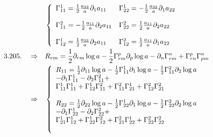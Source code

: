 \begin{align}
& \left \{ \begin{array}{ll}
\Gamma^1_{11} = \frac{1}{2}\frac{a_{22}}{a}\partial_1 a_{11}&\Gamma^1_{22} =- \frac{1}{2}\frac{a_{22}}{a}\partial_1 a_{22}\\\\
\Gamma^2_{11} =- \frac{1}{2}\frac{a_{11}}{a}\partial_2 a_{11}&\Gamma^2_{22} = \frac{1}{2}\frac{a_{11}}{a}\partial_2 a_{22}\\\\
\Gamma^1_{12} = \frac{1}{2}\frac{a_{22}}{a}\partial_2 a_{11}&\Gamma^2_{12} = \frac{1}{2}\frac{a_{11}}{a}\partial_1 a_{22}
\end {array}\right. \\
\text{3.205.}\quad\Rightarrow\quad & R_{rm} = \frac{1}{2}\partial_{rm} \log a - \frac{1}{2} \Gamma^p_{rm}\partial_p \log a-\partial_n\Gamma^n_{rm} + \Gamma^p_{rn}\Gamma^n_{pm}\\
\Rightarrow\quad &\left \{ \begin{array}{l}
 R_{11} =  \frac{1}{2}\partial_{11} \log a - \frac{1}{2} \Gamma^1_{11}\partial_1 \log a- \frac{1}{2} \Gamma^2_{11}\partial_2 \log a \\
 -\partial_1\Gamma^1_{11}-\partial_2\Gamma^2_{11} + 
 \\ \Gamma^1_{11}\Gamma^1_{11}+ \Gamma^1_{12}\Gamma^2_{11}+ \Gamma^2_{11}\Gamma^1_{21}+ \Gamma^2_{12}\Gamma^2_{21}\\\\
  R_{22} =  \frac{1}{2}\partial_{22} \log a - \frac{1}{2} \Gamma^1_{22}\partial_1 \log a- \frac{1}{2} \Gamma^2_{22}\partial_2 \log a \\
 -\partial_1\Gamma^1_{22}-\partial_2\Gamma^2_{22} + 
 \\ \Gamma^1_{21}\Gamma^1_{12}+ \Gamma^1_{22}\Gamma^2_{12}+ \Gamma^2_{21}\Gamma^1_{22}+ \Gamma^2_{22}\Gamma^2_{22}\\\\
 \end {array}\right.
 \end{align}
